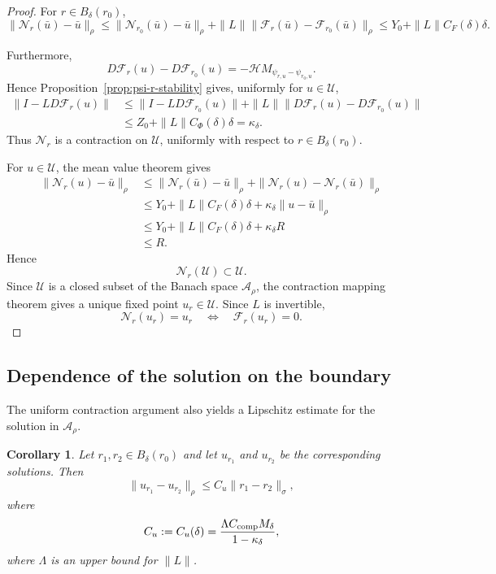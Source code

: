 \documentclass[11pt,a4paper]{amsart}
\newtheorem{corollary}[theorem]{Corollary}
\begin{document}
\begin{proof}
	For $r\in B_\delta(r_0)$,
	\[
		\|\mathcal N_r(\bar u)-\bar u\|_\rho\le
		\|\mathcal N_{r_0}(\bar u)-\bar u\|_\rho
+\|L\|\|\mathcal F_r(\bar u)-\mathcal F_{r_0}(\bar u)\|_\rho
\le Y_0+\|L\|C_F(\delta)\delta.
	\]
	
	Furthermore,
	\[
	D\mathcal F_r(u)
	-
	D\mathcal F_{r_0}(u)
	=
	-\mathcal H
	M_{\psi_{r,u}-\psi_{r_0,u}}.
	\]
	Hence Proposition~\ref{prop:psi-r-stability} gives, uniformly for
	$u\in\mathcal U$,
	\[
	\begin{aligned}
		\|I-LD\mathcal F_r(u)\|
		&\le
		\|I-LD\mathcal F_{r_0}(u)\|
+\|L\|\|D\mathcal F_r(u)-D\mathcal F_{r_0}(u)\|
		\\
		&\le
		Z_0
		+
		\|L\|C_\Phi(\delta)\delta=\kappa_\delta.
	\end{aligned}
	\]
	Thus $\mathcal N_r$ is a contraction on $\mathcal U$, uniformly
	with respect to $r\in B_\delta(r_0)$.
	
	For $u\in\mathcal U$, the mean value theorem gives
	\[
	\begin{aligned}
		\|\mathcal N_r(u)-\bar u\|_\rho
		&\le
		\|\mathcal N_r(\bar u)-\bar u\|_\rho
		+
		\|\mathcal N_r(u)-\mathcal N_r(\bar u)\|_\rho
		\\
		&\le
		Y_0
		+
		\|L\|C_F(\delta)\delta
		+
		\kappa_\delta\|u-\bar u\|_\rho
		\\
		&\le
		Y_0
		+
		\|L\|C_F(\delta)\delta
		+
		\kappa_\delta R
		\\
		&\le
		R.
	\end{aligned}
	\]
	Hence
	\[
	\mathcal N_r(\mathcal U)\subset\mathcal U.
	\]
	Since $\mathcal U$ is a closed subset of the Banach space
	$\mathcal A_\rho$, the contraction mapping theorem gives a unique
	fixed point $u_r\in\mathcal U$. Since $L$ is invertible,
	\[
	\mathcal N_r(u_r)=u_r
	\quad\Longleftrightarrow\quad
	\mathcal F_r(u_r)=0.
	\]
\end{proof}


\subsection{Dependence of the solution on the boundary}

The uniform contraction argument also yields a Lipschitz estimate for
the solution in $\mathcal A_\rho$.

\begin{corollary}\label{cor:u-lipschitz-r}
	Let $r_1,r_2\in B_\delta(r_0)$ and let $u_{r_1}$ and $u_{r_2}$ be
	the corresponding solutions. Then
	\begin{equation}\label{eq:u-lipschitz-r}
		\|u_{r_1}-u_{r_2}\|_\rho \le C_u\|r_1-r_2\|_\sigma,
	\end{equation}
	where
	\begin{equation}\label{eq:Cu}
		C_u:=C_u(\delta)=
		\frac{\Lambda C_{\rm comp}M_\delta}{1-\kappa_\delta},
	\end{equation}
	where $\Lambda$ is an upper bound for $\|L\|$.
\end{corollary}
\end{document}
